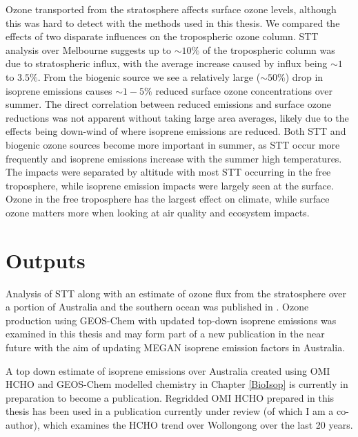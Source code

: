   
  Ozone transported from the stratosphere affects surface ozone levels, although this was hard to detect with the methods used in this thesis.
  We compared the effects of two disparate influences on the tropospheric ozone column.
  STT analysis over Melbourne suggests up to $\sim 10\%$ of the tropospheric column was due to stratospheric influx, with the average increase caused by influx being $\sim 1$ to $3.5\%$.
  From the biogenic source we see a relatively large ($\sim{50}\%$) drop in isoprene emissions causes $\sim{1-5}\%$ reduced surface ozone concentrations over summer.
  The direct correlation between reduced emissions and surface ozone reductions was not apparent without taking large area averages, likely due to the effects being down-wind of where isoprene emissions are reduced.
  Both STT and biogenic ozone sources become more important in summer, as STT occur more frequently and isoprene emissions increase with the summer high temperatures.
  The impacts were separated by altitude with most STT occurring in the free troposphere, while isoprene emission impacts were largely seen at the surface.
  Ozone in the free troposphere has the largest effect on climate, while surface ozone matters more when looking at air quality and ecosystem impacts.
  

  
  
\section{Outputs}
  \label{Conclusions:outputs}
  
  Analysis of STT along with an estimate of ozone flux from the stratosphere over a portion of Australia and the southern ocean was published in \textcite{Greenslade2017}.
  Ozone production using GEOS-Chem with updated top-down isoprene emissions was examined in this thesis and may form part of a new publication in the near future with the aim of updating MEGAN isoprene emission factors in Australia.
  
  A top down estimate of isoprene emissions over Australia created using OMI HCHO and GEOS-Chem modelled chemistry in Chapter \ref{BioIsop} is currently in preparation to become a publication.
  Regridded OMI HCHO prepared in this thesis has been used in a publication currently under review (of which I am a co-author), which examines the HCHO trend over Wollongong over the last 20 years.
  
